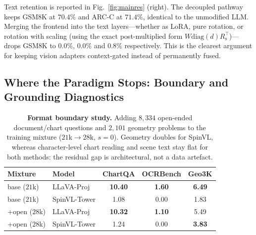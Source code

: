 \documentclass[10pt,twocolumn,letterpaper]{article}
\newcommand{\modelname}{SpinVL}
\begin{document}
Text retention is reported in Fig.~\ref{fig:mainres} (right). The decoupled
pathway keeps GSM8K at $70.4\%$ and ARC-C at $71.4\%$, identical to the
unmodified LLM. Merging the frontend into the text layers---whether as LoRA,
pure rotation, or rotation with scaling (using the exact post-multiplied form
$W\mathrm{diag}(d)R_{\mathrm{s}}^{\top}$)---drops GSM8K to $0.0\%$, $0.0\%$ and
$0.8\%$ respectively. This is the clearest argument for keeping vision
adapters context-gated instead of permanently fused.

\subsection{Where the Paradigm Stops: Boundary and Grounding Diagnostics}
\label{sec:boundary}

\begin{table}[t]
\centering
\caption{\textbf{Format boundary study.} Adding $8{,}334$ open-ended
document/chart questions and $2{,}101$ geometry problems to the training
mixture ($21$k$\to$$28$k, $s{=}0$). Geometry doubles for \modelname{}, whereas
character-level chart reading and scene text stay flat for both methods: the
residual gap is architectural, not a data artefact.}
\label{tab:boundary}
\footnotesize
\setlength{\tabcolsep}{4pt}
\begin{tabular}{@{}llccc@{}}
\toprule
Mixture & Model & ChartQA & OCRBench & Geo3K \\
\midrule
base ($21$k)      & LLaVA-Proj & \textbf{10.40} & \textbf{1.60} & \textbf{6.49} \\
base ($21$k)      & \modelname-Tower & 1.08 & 0.00 & 1.83 \\
\midrule
+open ($28$k)     & LLaVA-Proj & \textbf{10.32} & \textbf{1.10} & 5.49 \\
+open ($28$k)     & \modelname-Tower & 1.24 & 0.00 & \textbf{3.83} \\
\bottomrule
\end{tabular}
\end{table}
\end{document}

